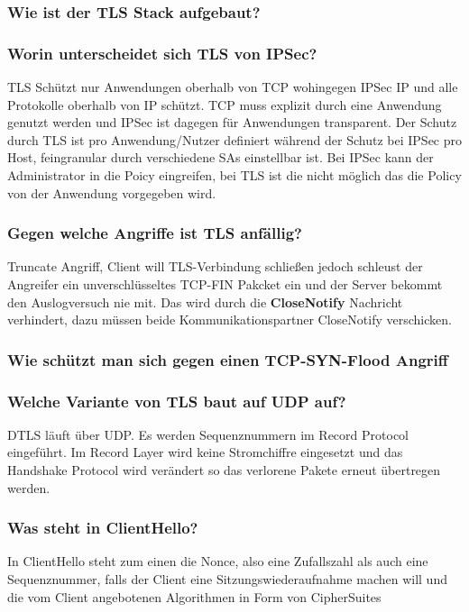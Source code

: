 	
	\subsubsection{Wie ist der TLS Stack aufgebaut?}

	
	\subsubsection{Worin unterscheidet sich TLS von IPSec?}
	TLS Schützt nur Anwendungen oberhalb von TCP wohingegen IPSec IP und alle Protokolle oberhalb von IP schützt. TCP muss explizit durch eine Anwendung genutzt werden und IPSec ist dagegen für Anwendungen transparent.
	Der Schutz durch TLS ist pro Anwendung/Nutzer definiert während der Schutz bei IPSec pro Host, feingranular durch verschiedene SAs einstellbar ist. Bei IPSec kann der Administrator in die Poicy eingreifen, bei TLS ist die nicht möglich das die Policy von der Anwendung vorgegeben wird.

	\subsubsection{Gegen welche Angriffe ist TLS anfällig?}
	Truncate Angriff, Client will TLS-Verbindung schließen jedoch schleust der Angreifer ein unverschlüsseltes TCP-FIN Pakcket ein und der Server bekommt den Auslogversuch nie mit.\newline
	Das wird durch die \textbf{CloseNotify} Nachricht verhindert, dazu müssen beide Kommunikationspartner CloseNotify verschicken.

	\subsubsection{Wie schützt man sich gegen einen TCP-SYN-Flood Angriff}
	
	\subsubsection{Welche Variante von TLS baut auf UDP auf?}
	DTLS läuft über UDP. Es werden Sequenznummern im Record Protocol eingeführt. Im Record Layer wird keine Stromchiffre eingesetzt und das Handshake Protocol wird verändert so das verlorene Pakete erneut übertregen werden.
		
	\subsubsection{Was steht in ClientHello?}
	In ClientHello steht zum einen die Nonce, also eine Zufallszahl als auch eine Sequenznummer, falls der Client eine Sitzungswiederaufnahme machen will und die vom Client angebotenen Algorithmen in Form von CipherSuites

